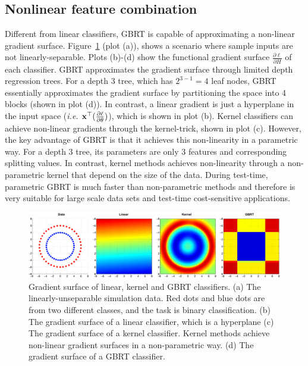 \subsection{Nonlinear feature combination} Different from linear classifiers, GBRT is capable of approximating a non-linear gradient surface. Figure~\ref{fig:simul} (plot (a)), shows a scenario where sample inputs are not linearly-separable. Plots (b)-(d) show the functional gradient surface $\frac{\partial \ell}{\partial H}$ of each classifier. GBRT approximates the gradient surface through limited depth regression trees. For a depth $3$ tree, which has $2^{3-1} = 4$ leaf nodes, GBRT essentially approximates the gradient surface by partitioning the space into 4 blocks (shown in plot (d)). In contrast, a linear gradient is just a hyperplane in the input space (\emph{i.e. } $\mathbf{x}^\top (\frac{\partial \ell}{\partial \theta})$), which is shown in plot (b). Kernel classifiers can achieve non-linear gradients through the kernel-trick, shown in plot (c). However, the key advantage of GBRT is that it achieves this non-linearity in a parametric way. For a depth $3$ tree, its parameters are only $3$ features and corresponding splitting values. In contrast, kernel methods achieves non-linearity through a non-parametric kernel that depend on the size of the data. During test-time, parametric GBRT is much faster than non-parametric methods and therefore is very suitable for large scale data sets and test-time cost-sensitive applications. 
 
\begin{figure}[t!!!]
\centerline{
\includegraphics[width = \textwidth]{plots/grad_simul.pdf}%
}
\caption{Gradient surface of linear, kernel and GBRT classifiers. (a) The linearly-unseparable simulation data. Red dots and blue dots are from two different classes, and the task is binary classification. (b) The gradient surface of a linear classifier, which is a hyperplane (c) The gradient surface of a kernel classifier. Kernel methods achieve non-linear gradient surfaces in a non-parametric way. (d) The gradient surface of a GBRT classifier. }
\label{fig:simul}
\end{figure}





